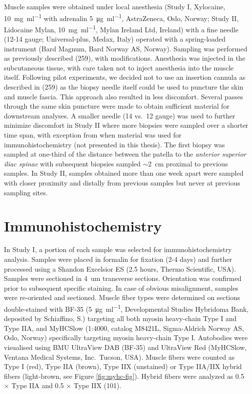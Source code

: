 \documentclass[twoside,10pt]{gihclass} %
\begin{document}
Muscle samples were obtained under local anesthesia (Study I, Xylocaine,
\SI{10}{\mg\per\ml} with adrenalin \SI{5}{\micro\gram\per\ml},
AstraZeneca, Oslo, Norway; Study II, Lidocaine Mylan, \SI{10}{\mg\per\ml}, Mylan Ireland Ltd, Ireland) with a fine needle (12-14 gauge; Universal-plus, Medax, Italy) operated with a spring-loaded instrument (Bard Magnum, Bard Norway AS, Norway). Sampling was performed as previously described (259), with modifications. Anesthesia was injected in the subcutaneous tissue, with care taken not to inject anesthesia into the muscle itself. Following pilot experiments, we decided not to use an insertion cannula as described in (259) as the biopsy needle itself could be used to puncture the skin and muscle fascia. This approach also resulted in less discomfort. Several passes through the same skin puncture were made to obtain sufficient material for downstream analyses. A smaller needle (14 vs.~12 gauge) was used to further minimize discomfort in Study II where more biopsies were sampled over a shorter time span, with exception from when material was used for immunohistochemistry (not presented in this thesis). The first biopsy was
sampled at one-third of the distance between the patella to the \emph{anterior superior iliac spinae} with subsequent biopsies sampled \(\sim\)\SI{2}{cm} proximal to previous samples. In Study II, samples obtained more than one week apart were sampled with closer proximity and distally from previous samples but never at previous sampling sites.

\hypertarget{immunohistochemistry}{%
\section{Immunohistochemistry}\label{immunohistochemistry}}

In Study I, a portion of each sample was selected for immunohistochemistry analysis. Samples were placed in formalin for fixation (2-4 days) and further processed using a Shandon Excelsior ES (2.5 hours, Thermo Scientific, USA). Samples were sectioned in \SI{4}{um} transverse sections. Orientation was confirmed prior to subsequent specific staining. In case of obvious misalignment, samples were re-oriented and sectioned. Muscle fiber types were determined on sections double-stained with BF-35 (\SI{5}{\micro\gram\per\milli\litre}, Developmental Studies Hybridoma Bank, deposited by Schiaffino, S.) targeting all both myosin heavy-chain Type I and Type IIA, and MyHCSlow (1:4000, catalog M8421L, Sigma-Aldrich Norway AS, Oslo, Norway) specifically targeting myosin heavy-chain Type I.
Antobodies were visualised using BMU UltraView DAB (BF-35) and UltraView Red (MyHCSlow, Ventana Medical Systems, Inc.~Tucson, USA).
Muscle fibers were counted as Type I (red), Type IIA (brown), Type IIX (unstained) or Type IIA/IIX hybrid fibers (light-brown, see Figure \ref{fig:myhc-fig}). Hybrid fibers were analyzed as 0.5 \(\times\) Type IIA and 0.5 \(\times\) Type IIX
(101).
\end{document}
